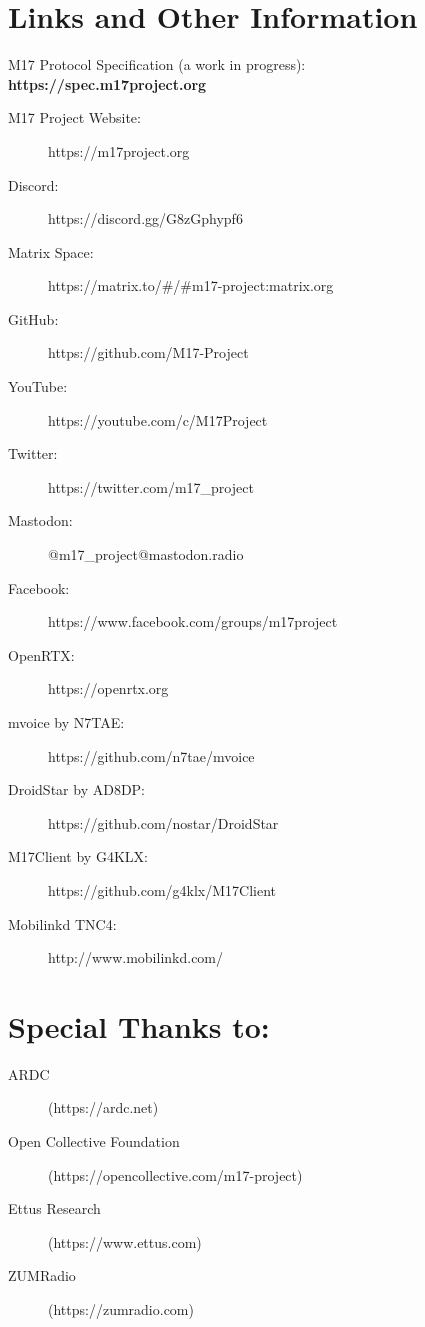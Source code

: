 \documentclass[10pt,letterpaper,notitlepage]{article}
\begin{document}
  \section*{Links and Other Information}
    \begin{boxA}
      \centering
      {\large M17 Protocol Specification (a work in progress):}\\
      \textbf{https://spec.m17project.org}\\
    \end{boxA}
  \begin{multicols}{2}
    \raggedright
    \begin{description}
      \item[M17 Project Website:]https://m17project.org
      \item[Discord:]https://discord.gg/G8zGphypf6
      \item[Matrix Space:]https://matrix.to/\#/\#m17-project:matrix.org
      \item[GitHub:]https://github.com/M17-Project
      \item[YouTube:]https://youtube.com/c/M17Project
      \item[Twitter:]https://twitter.com/m17\_project
      \item[Mastodon:]@m17\_project@mastodon.radio
      \item[Facebook:]https://www.facebook.com/groups/m17project
      \item[OpenRTX:]https://openrtx.org
      \item[mvoice by N7TAE:]https://github.com/n7tae/mvoice
      \item[DroidStar by AD8DP:]https://github.com/nostar/DroidStar
      \item[M17Client by G4KLX:]https://github.com/g4klx/M17Client
      \item[Mobilinkd TNC4:]http://www.mobilinkd.com/
    \end{description}
  \end{multicols}
  \centering
  \section*{Special Thanks to:}
    \raggedright
    \begin{description}
      \item[ARDC] (https://ardc.net)
      \item[Open Collective Foundation] (https://opencollective.com/m17-project)
      \item[Ettus Research] (https://www.ettus.com)
      \item[ZUMRadio] (https://zumradio.com)
    \end{description}
\end{document}
